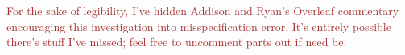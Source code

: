 \documentclass{article}
\newcommand{\ahcomment}[1]{{\color{red}[AH: #1]}}
\begin{document}
\textcolor{brown}{For the sake of legibility, I've hidden Addison and Ryan's Overleaf commentary encouraging this investigation into misspecification error. It's entirely possible there's stuff I've missed; feel free to uncomment parts out if need be.}







\end{document}
